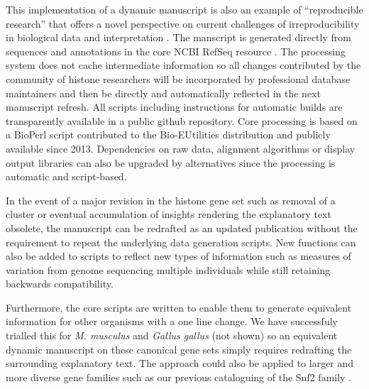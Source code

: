 	This implementation of a dynamic manuscript 
	is also an example of ``reproducible research'' \citep{reproducible-research-bioinformatics,reproducible-research-law}
	that offers a novel perspective on 
	current challenges of irreproducibility in biological data and interpretation \citep{ErrorProne2012,OpenPrograms2012}.
	The manscript is generated directly from sequences and annotations 
	in the core NCBI RefSeq resource \citep{PruittRefseq2014}.
	The processing system does not cache intermediate information so all changes contributed by
	the community of histone researchers will be incorporated by professional database maintainers 
	and then be directly and automatically reflected in the next manuscript refresh.
	All scripts including instructions for automatic builds 
	are transparently available in a public github repository.
	Core processing is based on a BioPerl script contributed to the Bio-EUtilities distribution 
	and publicly available since 2013.
	Dependencies on raw data, alignment algorithms or display output libraries
	can also be upgraded by alternatives since the processing is automatic and script-based.

	In the event of a major revision in the histone gene set such as removal of a cluster 
	or eventual accumulation of insights rendering the explanatory text obsolete, 
	the manuscript can be redrafted as an updated publication 
	without the requirement to repeat the underlying data generation scripts.
	New functions can also be added to scripts to reflect new types of information 
	such as measures of variation from genome sequencing multiple individuals 
	while still retaining backwards compatibility.

	Furthermore, the core scripts are written to enable them to generate 
	equivalent information for other organisms with a one line change. 
	We have successfuly trialled this for \textit{M. musculus} and \textit{Gallus gallus} (not shown) 
	so an equivalent dynamic manuscript on these canonical gene sets 
	simply requires redrafting the surrounding explanatory text.
	The approach could also be applied to larger and more diverse gene families such as
	our previous cataloguing of the Snf2 family \citep{andrew-snf2-catalogue}.